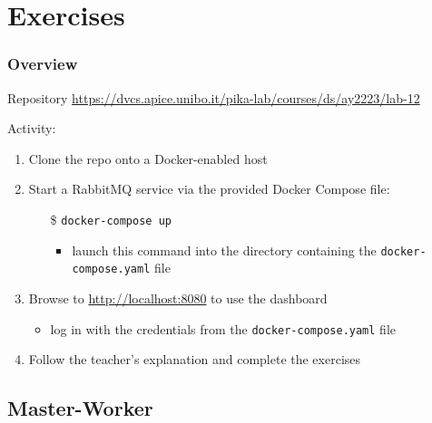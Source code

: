 \documentclass{beamer}\mode<presentation>{\usetheme{AMSBolognaFC}}
\newcommand{\labN}{12}
\newcommand{\labGroup}{https://dvcs.apice.unibo.it/pika-lab/courses/ds/ay2223}
\newcommand{\labRepo}{\labGroup/lab-\labN}
\begin{document}
\section{Exercises}

\begin{frame}
	\frametitle{Overview}

	\begin{block}{Repository}\centering
		\small\url{\labRepo}
	\end{block}

	\vfill

	Activity:
	\vfill
	\begin{enumerate}
		\item Clone the repo onto a \alert{Docker-enabled} host

		\vfill

		\item Start a RabbitMQ service via the provided Docker Compose file:
        \begin{itemize}
            \item[\$] \texttt{docker-compose up}
            \begin{itemize}
                \item launch this command into the directory containing the \texttt{docker-compose.yaml} file
            \end{itemize}
        \end{itemize}

        \vfill

        \item Browse to \url{http://localhost:8080} to use the dashboard
        \begin{itemize}
            \item log in with the credentials from the \texttt{docker-compose.yaml} file
        \end{itemize}

        \vfill

        \item Follow the teacher's explanation and complete the exercises

	\end{enumerate}

\end{frame}

\subsection{Master-Worker}
\end{document}
